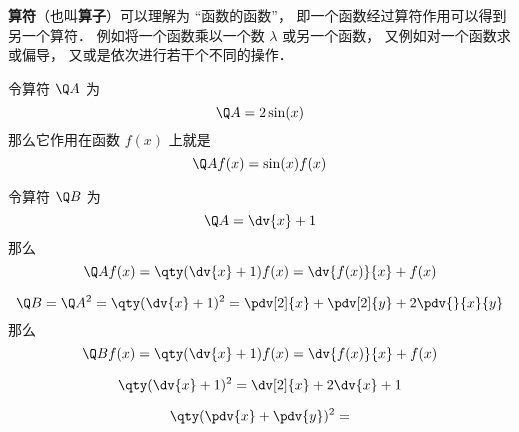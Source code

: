 

\textbf{算符}（也叫\textbf{算子}）可以理解为 “函数的函数”， 即一个函数经过算符作用可以得到另一个算符． 例如将一个函数乘以一个数 $\lambda$ 或另一个函数， 又例如对一个函数求或偏导， 又或是依次进行若干个不同的操作．

\begin{example}{}
令算符 $\Q A$ 为
\begin{equation}
\Q A = 2\sin(x)
\end{equation}
那么它作用在函数 $f(x)$ 上就是
\begin{equation}
\Q A f(x) = \sin(x) f(x)
\end{equation}

令算符 $\Q B$ 为
\begin{equation}
\Q A = \dv{x} + 1
\end{equation}
那么
\begin{equation}
\Q A f(x) = \qty(\dv{x} + 1)f(x) = \dv{f(x)}{x} + f(x)
\end{equation}


\begin{equation}
\Q B = \Q A^2 = \qty(\dv{x} + 1)^2 = \pdv[2]{x} + \pdv[2]{y} + 2\pdv{}{x}{y}
\end{equation}
那么
\begin{equation}
\Q B f(x) = \qty(\dv{x} + 1)f(x) = \dv{f(x)}{x} + f(x)
\end{equation}
\end{example}


\begin{equation}
\qty(\dv{x} + 1)^2 = \dv[2]{x} + 2\dv{x} + 1
\end{equation}

\begin{equation}
\qty(\pdv{x} + \pdv{y})^2 = 
\end{equation}

